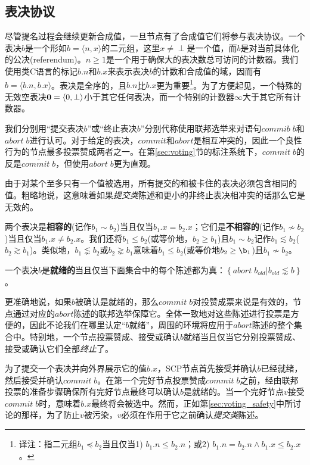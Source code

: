 \subsection{表决协议}
尽管提名过程会继续更新合成值，一旦节点有了合成值它们将参与表决协议。一个表决$b$是一个形如$b=\langle n,x\rangle$的二元组，这里$x\neq \perp$是一个值，而$b$是对当前{\slot}具体化的公决(referendum)。$n\geq 1$是一个用于确保大的表决数总可访问的计数器。我们使用类C语言的标记$b.n$和$b.x$来表示表决$b$的计数和合成值的域，因而有$b=\langle b.n, b.x\rangle$。表决是全序的，且$b.n$比$b.x$更为重要{\footnote{译注：指二元组$b_1\preceq b_2$当且仅当1) $b_1.n \leq b_2.n$；或2) $b_1.n=b_2.n \wedge b_1.x \leq b_2.x$。}}。为了方便起见，一个特殊的无效空表决${\bm 0}=\langle 0,\perp\rangle$小于其它任何表决，而一个特别的计数器$\infty$大于其它所有计数器。

我们分别用``提交表决$b$''或``终止表决$b$''分别代称使用联邦选举来对语句$commib\;b$和$abort\;b$进行认可。对于给定的表决，$commit$和$abort$是相互冲突的，因此一个良性行为的节点最多投票赞成两者之一。在第\ref{sec:voting}节的标注系统下，$commit\;b$的反是$\overline{commit\;b}$，但使用$abort\;b$更为直观。

由于对某个{\slot}至多只有一个值被选用，所有提交的和被卡住的表决必须包含相同的值。粗略地说，这意味着如果\textit{提交类}陈述和更小的非终止表决相冲突的话那么它是无效的。

\begin{definition}[相容的]
        两个表决是\textbf{相容的}(记作$b_1 \sim b_2$)当且仅当$b_1.x=b_2.x$；它们是\textbf{不相容的}(记作$b_1\not\sim b_2$)当且仅当$b_1.x\neq b_2.x$。我们还将$b_1\leq b_2$(或等价地，$b_2\geq b_1$)且$b_1\sim b_2$记作$b_1\lesssim b_2$($b_2\gtrsim b_1$)。类似地，$b_1\lnsim b_2$或$b_2\gnsim b_1$意味着$b_1\leq b_2$(或等价地$b_2\geq \b_1$)且$b_1\not\sim b_2$。
\end{definition}

\begin{definition}[就绪的]
        一个表决$b$是\textbf{就绪的}当且仅当下面集合中的每个陈述都为真：$\left\{abort\;b_{old}|b_{old}\lnsim b\right\}$。
\end{definition}

更准确地说，如果$b$被确认是就绪的，那么$commit\;b$对投赞成票来说是有效的，节点通过对应的$abort$陈述的联邦选举保障它。全体一致地对这些陈述进行投票是方便的，因此不论我们在哪里认定{}``$b$就绪''，周围的环境将应用于$abort$陈述的整个集合中。特别地，一个节点投票赞成、接受或确认$b$就绪当且仅当它分别投票赞成、接受或确认它们全部\textit{终止}了。

为了提交一个表决并向外界展示它的值$b.x$，SCP节点首先接受并确认$b$已经就绪，然后接受并确认$commit\;b$。在第一个完好节点投票赞成$commit\;b$之前，经由联邦投票的准备步骤确保所有完好节点最终可以确认$b$是就绪的。当一个完好节点$v$接受$commit\;b$时，意味着$b.x$最终将会被选中。然而，正如第\ref{sec:voting_safety}中所讨论的那样，为了防止$v$被污染，$v$必须在作用于它之前确认\textit{提交类}陈述。


